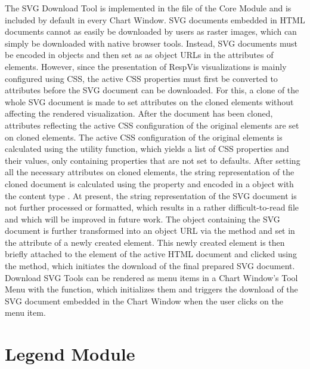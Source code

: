 The SVG Download Tool is implemented in the
 file of the Core Module and is
included by default in every Chart Window.  SVG documents embedded in
HTML documents cannot as easily be downloaded by users as raster
images, which can simply be downloaded with native browser tools.
Instead, SVG documents must be encoded in  objects and then
set as as object URLs in the  attributes of 
elements.  However, since the presentation of RespVis visualizations
is mainly configured using CSS, the active CSS properties must first
be converted to attributes before the SVG document can be downloaded.
For this, a clone of the whole SVG document is made to set attributes
on the cloned elements without affecting the rendered visualization.
After the document has been cloned, attributes reflecting the active
CSS configuration of the original elements are set on cloned elements.
The active CSS configuration of the original elements is calculated
using the  utility function,
which yields a list of CSS properties and their values, only
containing properties that are not set to defaults.  After setting all
the necessary attributes on cloned elements, the string representation
of the cloned document is calculated using the
 property and encoded in a  object
with the content type .  At present, the string
representation of the SVG document is not further processed or
formatted, which results in a rather difficult-to-read file and which
will be improved in future work.  The  object containing
the SVG document is further transformed into an object URL via the
 method and set in the  attribute
of a newly created  element.  This newly created 
element is then briefly attached to the  element of the
active HTML document and clicked using the 
method, which initiates the download of the final prepared SVG
document.  Download SVG Tools can be rendered as menu items in a Chart
Window's Tool Menu with the  function,
which initializes them and triggers the download of the SVG document
embedded in the Chart Window when the user clicks on the menu item.




\section{Legend Module}

